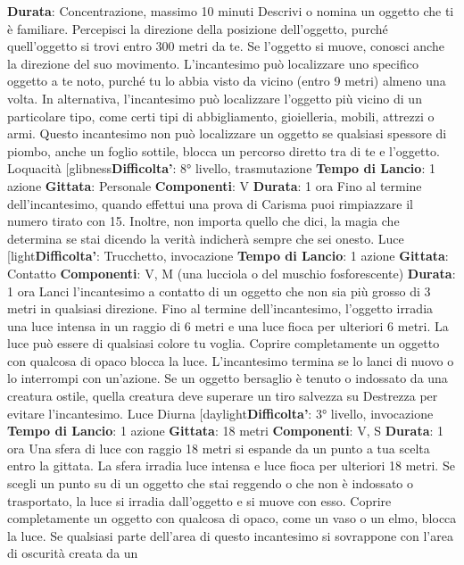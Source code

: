 \begin{multicols}{2}
\textbf{Durata}: Concentrazione, massimo 10 minuti
Descrivi o nomina un oggetto che ti è familiare.
Percepisci la direzione della posizione dell’oggetto,
purché quell’oggetto si trovi entro 300 metri da te. Se
l’oggetto si muove, conosci anche la direzione del suo
movimento.
L’incantesimo può localizzare uno specifico oggetto a te
noto, purché tu lo abbia visto da vicino (entro 9 metri)
almeno una volta. In alternativa, l’incantesimo può
localizzare l’oggetto più vicino di un particolare tipo,
come certi tipi di abbigliamento, gioielleria, mobili,
attrezzi o armi.
Questo incantesimo non può localizzare un oggetto se
qualsiasi spessore di piombo, anche un foglio sottile,
blocca un percorso diretto tra di te e l’oggetto.
Loquacità
[glibness\textbf{Difficolta'}:
8° livello, trasmutazione
\textbf{Tempo di Lancio}: 1 azione
\textbf{Gittata}: Personale
\textbf{Componenti}: V
\textbf{Durata}: 1 ora
Fino al termine dell’incantesimo, quando effettui una
prova di Carisma puoi rimpiazzare il numero tirato con
15. Inoltre, non importa quello che dici, la magia che
determina se stai dicendo la verità indicherà sempre
che sei onesto.
Luce
[light\textbf{Difficolta'}:
Trucchetto, invocazione
\textbf{Tempo di Lancio}: 1 azione
\textbf{Gittata}: Contatto
\textbf{Componenti}: V, M (una lucciola o del muschio
fosforescente)
\textbf{Durata}: 1 ora
Lanci l’incantesimo a contatto di un oggetto che non sia
più grosso di 3 metri in qualsiasi direzione. Fino al
termine dell’incantesimo, l’oggetto irradia una luce
intensa in un raggio di 6 metri e una luce fioca per
ulteriori 6 metri. La luce può essere di qualsiasi colore
tu voglia. Coprire completamente un oggetto con
qualcosa di opaco blocca la luce. L’incantesimo termina
se lo lanci di nuovo o lo interrompi con un’azione.
Se un oggetto bersaglio è tenuto o indossato da una
creatura ostile, quella creatura deve superare un tiro
salvezza su Destrezza per evitare l’incantesimo.
Luce Diurna
[daylight\textbf{Difficolta'}:
3° livello, invocazione
\textbf{Tempo di Lancio}: 1 azione
\textbf{Gittata}: 18 metri
\textbf{Componenti}: V, S
\textbf{Durata}: 1 ora
Una sfera di luce con raggio 18 metri si espande da un
punto a tua scelta entro la gittata. La sfera irradia luce
intensa e luce fioca per ulteriori 18 metri.
Se scegli un punto su di un oggetto che stai reggendo o
che non è indossato o trasportato, la luce si irradia
dall’oggetto e si muove con esso. Coprire
completamente un oggetto con qualcosa di opaco,
come un vaso o un elmo, blocca la luce.
Se qualsiasi parte dell’area di questo incantesimo si
sovrappone con l’area di oscurità creata da un

\end{multicols}
